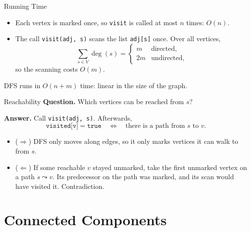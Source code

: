 \documentclass[10pt,aspectratio=169]{beamer}
\begin{document}
\begin{frame}{Running Time}
  \begin{itemize}
    \item Each vertex is marked once, so \texttt{visit} is called at most
          $n$ times: $O(n)$.
    \pause
    \bigskip
    \item The call \texttt{visit(adj, s)} scans the list \texttt{adj[s]}
          once. Over all vertices,
          \[
            \sum_{s \in V} \deg(s) =
            \begin{cases}
              m  & \text{directed}, \\
              2m & \text{undirected},
            \end{cases}
          \]
          so the scanning costs $O(m)$.
  \end{itemize}

  \pause
  \bigskip
  \begin{alertblock}{}
    \centering DFS runs in $O(n + m)$ time: linear in the size of the graph.
  \end{alertblock}
\end{frame}

\begin{frame}{Reachability}
  \textbf{Question.} Which vertices can be reached from $s$?

  \bigskip
  \textbf{Answer.} Call \texttt{visit(adj, s)}. Afterwards,
  \[
    \texttt{visited[v]} = \texttt{true}
    \quad\Longleftrightarrow\quad
    \text{there is a path from } s \text{ to } v.
  \]

  \bigskip
  \pause
  \begin{itemize}
    \item ($\Rightarrow$) DFS only moves along edges, so it only marks
          vertices it can walk to from $s$.
    \item ($\Leftarrow$) If some reachable $v$ stayed unmarked, take the first
          unmarked vertex on a path $s \leadsto v$. Its predecessor on the path
          was marked, and its scan would have visited it. Contradiction.
  \end{itemize}
\end{frame}

\section{Connected Components}
\end{document}
